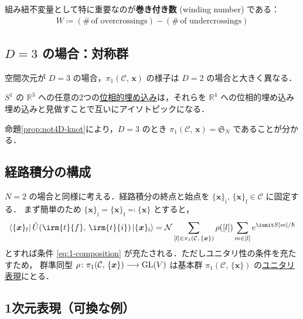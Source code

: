 \documentclass[TQFT_main]{subfiles}
\begin{document}
組み紐不変量として特に重要なのが\textbf{巻き付き数} (winding number) である：
\begin{align}
    W \coloneqq (\#\, \text{of overcrossings}) - (\#\, \text{of undercrossings})
\end{align}

\subsection{$D = 3$ の場合：対称群}

空間次元が $D = 3$ の場合，$\pi_1 (\mathcal{C},\, \bm{x})$ の様子は $D=2$ の場合と大きく異なる．

\begin{myprop}[label=prop:not4D-knot]{}
    $S^1$ の $\mathbb{R}^3$ への任意の2つの\hyperref[def:submersion-smooth]{位相的埋め込み}は，それらを $\mathbb{R}^4$ への位相的埋め込み埋め込みと見做すことで互いにアイソトピックになる．
\end{myprop}

命題\ref{prop:not4D-knot}により，$D=3$ のとき $\pi_1 (\mathcal{C},\, \bm{x}) = \mathfrak{S}_N$ であることが分かる． 

\subsection{経路積分の構成}

$N = 2$ の場合と同様に考える．経路積分の終点と始点を $\{\bm{x}\}_{\mathrm{i}},\, \{\bm{x}\}_{\mathrm{f}} \in \mathcal{C}$ に固定する．
まず簡単のため $\{\bm{x}\}_{\mathrm{i}} = \{\bm{x}\}_{\mathrm{f}} \eqqcolon \{\bm{x}\}$ とすると，
\begin{align}
    \bra{\{\bm{x}\}_{\mathrm{f}}} \hat{U}(\irm{t}{f},\, \irm{t}{i}) \ket{\{\bm{x}\}_{\mathrm{i}}} =\mathcal{N} \sum_{[l] \in \pi_1(\mathcal{C},\, \{\bm{x}\})} \rho([l]) \sum_{m \in [l]} e^{\iunit S[m]/\hbar}
\end{align}
とすれば条件 \eqref{eq:1-composition} が充たされる．ただしユニタリ性の条件を充たすため，
群準同型
$\rho \colon \pi_1(\mathcal{C},\, \{\bm{x}\}) \longrightarrow \mathrm{GL}(V)$ 
は基本群 $\pi_1(\mathcal{C},\, \{\bm{x}\})$ の\underline{ユニタリ表現}にとる．

\subsection{1次元表現（可換な例）}
\end{document}
